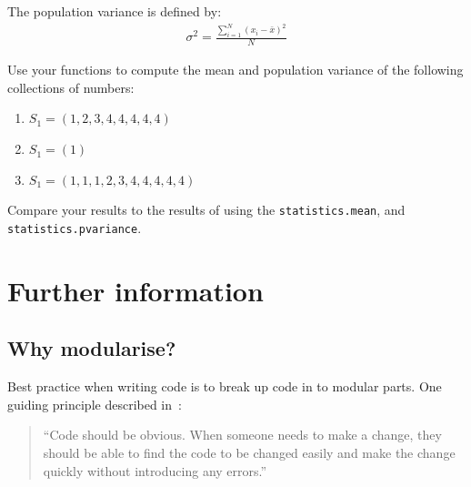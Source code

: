 \begin{enumerate}
The population variance is defined by:
\begin{equation*}
\begin{split}
    \sigma ^ 2 = \frac{\sum_{i=1}^{N} (x_i - \bar x) ^ 2}{N}
   \end{split}
\end{equation*}

Use your functions to compute the mean and population variance of the following
collections of numbers:
\begin{enumerate}

\item 

\(S_1=(1, 2, 3, 4, 4, 4, 4, 4)\)

\item 

\(S_1=(1)\)

\item 

\(S_1=(1, 1, 1, 2, 3, 4, 4, 4, 4, 4)\)

\end{enumerate}


Compare your results to the results of using the \texttt{statistics.mean},
and \texttt{statistics.pvariance}. 

\end{enumerate}



\section{Further information}
\label{\detokenize{building-tools/05-modularisation/why/main:further-information}}\label{\detokenize{building-tools/05-modularisation/why/main::doc}}

\subsection{Why modularise?}
\label{\detokenize{building-tools/05-modularisation/why/main:why-modularise}}\label{\detokenize{building-tools/05-modularisation/why/main:id1}}

Best practice when writing code is to break up code in to modular parts. One
guiding principle described in~\cite{fowler2018refactoring}:




\begin{quote}
``Code should be obvious. When someone needs to make a change, they should be
able to find the code to be changed easily and make the change quickly without
introducing any errors.''
\end{quote}






